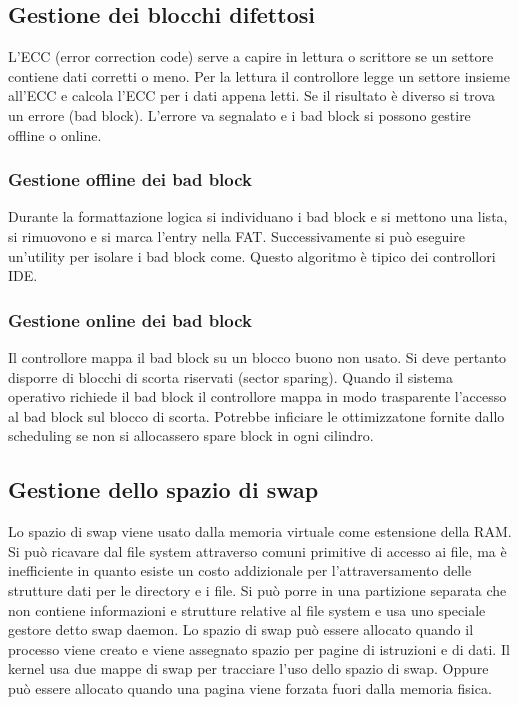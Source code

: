 \subsection{Gestione dei blocchi difettosi}
L'ECC (error correction code) serve a capire in lettura o scrittore se un settore contiene dati corretti o meno. Per la lettura il controllore legge un settore insieme all'ECC e calcola
l'ECC per i dati appena letti. Se il risultato \`e diverso si trova un errore (bad block). L'errore va segnalato e i bad block si possono gestire offline o online. 
\subsubsection{Gestione offline dei bad block}
Durante la formattazione logica si individuano i bad block e si mettono una lista, si rimuovono e si marca l'entry nella FAT. Successivamente si pu\`o eseguire un'utility per isolare i 
bad block come. Questo algoritmo \`e tipico dei controllori IDE. 
\subsubsection{Gestione online dei bad block}
Il controllore mappa il bad block su un blocco buono non usato. Si deve pertanto disporre di blocchi di scorta riservati (sector sparing). Quando il sistema operativo richiede il bad 
block il controllore mappa in modo trasparente l'accesso al bad block sul blocco di scorta. Potrebbe inficiare le ottimizzatone fornite dallo scheduling se non si allocassero spare
block in ogni cilindro. 
\subsection{Gestione dello spazio di swap}
Lo spazio di swap viene usato dalla memoria virtuale come estensione della RAM. Si pu\`o ricavare dal file system attraverso comuni primitive di accesso ai file, ma \`e inefficiente in
quanto esiste un costo addizionale per l'attraversamento delle strutture dati per le directory e i file. Si pu\`o porre in una partizione separata che non contiene informazioni e 
strutture relative al file system e usa uno speciale gestore detto swap daemon. Lo spazio di swap pu\`o essere allocato quando il processo viene creato e viene assegnato spazio per 
pagine di istruzioni e di dati. Il kernel usa due mappe di swap per tracciare l'uso dello spazio di swap. Oppure pu\`o essere allocato quando una pagina viene forzata fuori dalla memoria
fisica. 
